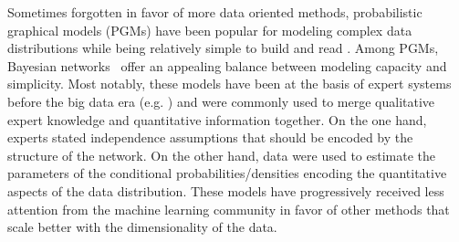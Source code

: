 \documentclass[twoside]{article}
\newcommand{\antoine}[1]{\textcolor{orange}{[AW: #1]}}
\begin{document}
Sometimes forgotten in favor of more data oriented methods, probabilistic graphical models (PGMs) have been popular for modeling complex data distributions while being relatively simple to build and read \citep{PGM-book, johnson2016composing}. Among PGMs, Bayesian networks~\citep[BNs, ][]{Pearl-BN} offer an appealing balance between modeling capacity and simplicity. Most notably, these models have been at the basis of expert systems before the big data era (e.g. \citep{BN-app-1, BN-app-2, BN-app-3}) and were commonly used to merge qualitative expert knowledge and quantitative information together. On the one hand, experts stated independence assumptions that should be encoded by the structure of the network. On the other hand, data were used to estimate the parameters of the conditional probabilities/densities encoding the quantitative aspects of the data distribution. %
These models have progressively received less attention from the machine learning community in favor of other methods that scale better with the dimensionality of the data. %
\end{document}
